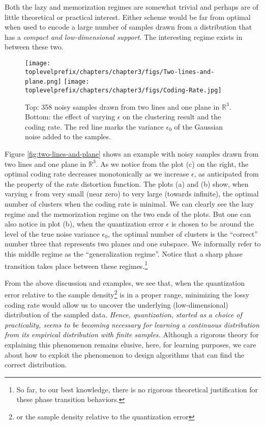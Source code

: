 \documentclass[../../book-main.tex]{subfiles}
\begin{document}
Both the lazy and memorization regimes are somewhat trivial and perhaps are of little theoretical or practical interest. Either scheme would be far from optimal when used to encode a large number of samples drawn from a distribution that has a {\em compact and low-dimensional support}. The interesting regime exists in between these two.
\begin{example}
	\begin{figure}[t]
		\centering
		\texttt{[image: \\toplevelprefix/chapters/chapter3/figs/Two-lines-and-plane.png]}
		\texttt{[image: \\toplevelprefix/chapters/chapter3/figs/Coding-Rate.jpg]}
		\caption{Top: 358  noisy samples drawn from two lines and one plane in $\mathbb{R}^3$. Bottom: the effect of varying $\epsilon$ on the clustering result and the coding rate. The red line marks the variance $\epsilon_0$ of the Gaussian noise added to the samples.}
		\label{fig:two-lines-and-plane}
		\label{fig:two-lines-and-plane-epsilon}
	\end{figure}
	Figure \ref{fig:two-lines-and-plane}  shows an example with noisy samples
	drawn from two lines and one plane in $\mathbb{R}^3$. As we notice from the
	plot (c) on the right, the optimal coding rate decreases monotonically as we
	increase $\epsilon$, as anticipated from the property of the rate distortion
	function. The plots (a) and (b) show, when varying $\epsilon$ from very
	small (near zero) to very large (towards infinite), the optimal number of
	clusters when the coding rate is minimal. We can clearly see the lazy regime
	and the memorization regime on the two ends of the plots. But one can also
	notice in plot (b), when the quantization error $\epsilon$ is chosen to be
	around the level of the true noise variance $\epsilon_0$, the optimal number
	of clusters is the ``correct'' number three that represents two planes and
	one subspace.  We informally refer to this middle regime as the
	``generalization regime''. Notice that a sharp phase transition takes place
	between these regimes.\footnote{So far, to our best knowledge, there is no rigorous theoretical justification for these phase transition behaviors.}
\end{example}


From the above discussion and examples, we see that, when the quantization error relative to the sample density\footnote{or the sample density relative to the quantization error} is in a proper range,  minimizing the lossy coding rate would allow us to uncover the underlying (low-dimensional) distribution of the sampled data. {\em Hence, quantization, started as a choice of practicality, seems to be becoming necessary for learning a continuous distribution from its empirical distribution with finite samples.} Although a rigorous theory for explaining this phenomenon remains elusive, here, for learning purposes, we care about how to exploit the phenomenon to design algorithms that can find the correct distribution.
\end{document}
